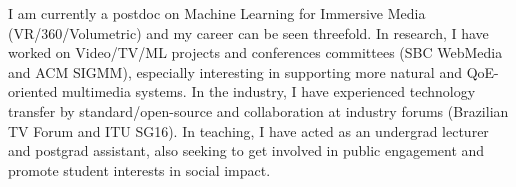 I am currently a postdoc on Machine Learning for Immersive Media (VR/360/Volumetric) and my career can be seen threefold.  In research, I have worked on Video/TV/ML projects and conferences committees (SBC WebMedia and ACM SIGMM), especially interesting in supporting more natural and QoE-oriented multimedia systems. In the industry, I have experienced technology transfer by standard/open-source and collaboration at industry forums (Brazilian TV Forum and ITU SG16). In teaching, I have acted as an undergrad lecturer and postgrad assistant, also seeking to get involved in public engagement and promote student interests in social impact.